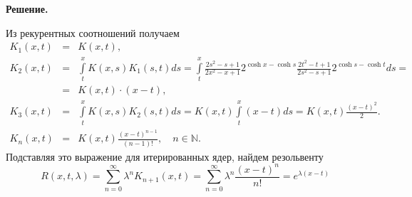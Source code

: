 \noindent
{\bf Решение.~}\\
\noindent

Из рекурентных соотношений получаем
$$
\begin{array}{rcl}
K_1(x,t)&=&\displaystyle K(x,t), \\[12pt]
K_2(x,t)&=&\displaystyle\int\limits_t^x K(x,s)K_1(s,t)ds = \int\limits_t^x \frac{2s^2 - s+1}{2x^2-x+1} 2^{\cosh x - \cosh s} \frac{2t^2 - t+1}{2s^2-s+1} 2^{\cosh s - \cosh t} ds =\\ 
&=& K(x,t)\cdot \left( x-t \right),  \\[12pt]
K_3(x,t)&=&\displaystyle\int\limits_t^x K(x,s)K_2(s,t)ds = K(x,t) \int\limits_t^x \left( x-t \right) ds = K(x,t) \frac{\left( x-t \right)^2}{2}.\\[12pt]
K_n(x,t)&=&\displaystyle K(x,t)\frac{\left(x-t\right)^{n-1}}{(n-1)!},\quad n \in \mathbb{N}.
\end{array}
$$
Подставляя это выражение для итерированных ядер, найдем резольвенту
$$ 
R(x,t,\lambda)=\sum_{n=0}^\infty \lambda^n K_{n+1}(x,t) =\sum_{n=0}^\infty \lambda^n \frac{\left(x-t\right)^{n}}{n!} = e^{\lambda(x-t)}

$$